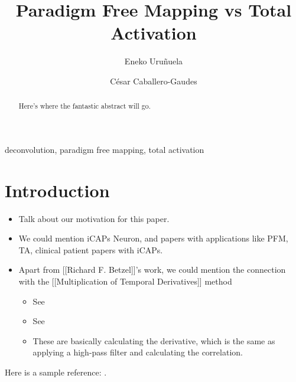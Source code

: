 \documentclass[5p]{elsarticle}
\begin{document}
\begin{frontmatter}

\title{Paradigm Free Mapping vs Total Activation}

\author[bcbl,upv]{Eneko Uru\~nuela}
\author[bcbl]{C\'{e}sar Caballero-Gaudes}

\address[bcbl]{Basque Center on Cognition, Brain and Language, Spain}
\address[upv]{University of the Basque Country, Spain}

\begin{abstract}
Here's where the fantastic abstract will go.
\end{abstract}

\begin{keyword}
deconvolution, paradigm free mapping, total activation
\end{keyword}

\end{frontmatter}

\linenumbers

\section{Introduction}

\begin{itemize}

    \item Talk about our motivation for this paper.

    \item We could mention iCAPs Neuron, and papers with applications like PFM, TA, clinical patient papers with iCAPs.

    \item Apart from [[Richard F. Betzel]]'s work, we could mention the connection with the [[Multiplication of Temporal Derivatives]] method

    \begin{itemize}
        \item See \cite{shine2015estimation}
        \item See \cite{shine2016dynamics}
        \item These are basically calculating the derivative, which is the same as applying a high-pass filter and calculating the correlation.
    \end{itemize}

\end{itemize}

Here is a sample reference: \cite{gitelman2003modeling}.
\end{document}
